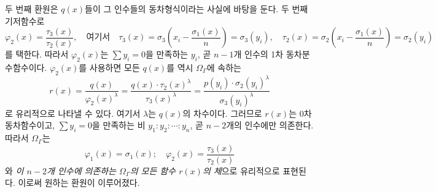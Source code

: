 두 번째 환원은 \(q(x)\)들이 그 인수들의 동차형식이라는 사실에 바탕을 둔다. 두 번째 기저함수로
\[
\varphi_2(x)=\frac{\tau_3(x)}{\tau_2(x)},\quad \text{여기서}\quad
\tau_3(x)=\sigma_3\left(x_i-\frac{\sigma_1(x)}{n}\right)=\sigma_3(y_i),\quad
\tau_2(x)=\sigma_2\left(x_i-\frac{\sigma_1(x)}{n}\right)=\sigma_2(y_i)
\]
를 택한다. 따라서 \(\varphi_2(x)\)는 \(\sum y_i=0\)을 만족하는 \(y_i\), 곧 \(n-1\)개 인수의 1차 동차분수함수이다. \(\varphi_2(x)\)를 사용하면 모든 \(q(x)\)를 역시 \(\Omega_\Gamma\)에 속하는
\[
r(x)=\frac{q(x)}{\varphi_2(x)^\lambda}=\frac{q(x)\cdot\tau_2(x)^\lambda}{\tau_3(x)^\lambda}=\frac{p(y_i)\cdot\sigma_2(y_i)^\lambda}{\sigma_3(y_i)^\lambda}
\]
로 유리적으로 나타낼 수 있다. 여기서 \(\lambda\)는 \(q(x)\)의 차수이다. 그러므로 \(r(x)\)는 0차 동차함수이고, \(\sum y_i=0\)을 만족하는 비 \(y_1:y_2:\cdots:y_n\), 곧 \(n-2\)개의 인수에만 의존한다. 따라서 \(\Omega_\Gamma\)는
\[
\varphi_1(x)=\sigma_1(x);\quad \varphi_2(x)=\frac{\tau_3(x)}{\tau_2(x)}
\]
와 \emph{이 \(n-2\)개 인수에 의존하는 \(\Omega_\Gamma\)의 모든 함수 \(r(x)\)의 체}으로 유리적으로 표현된다. 이로써 원하는 환원이 이루어졌다.

